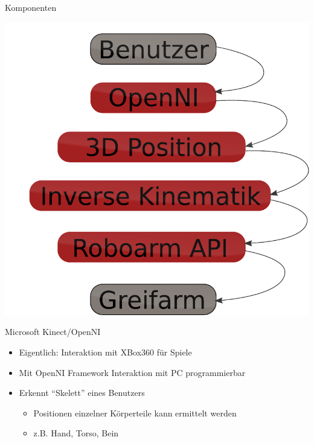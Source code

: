 \begin{frame}{Komponenten}
\begin{overprint}
 \begin{center}\includegraphics[height=0.8\textheight]{imgs/komponenten_5.pdf}\end{center}
\end{overprint}

\end{frame}

\begin{frame}{Microsoft Kinect/OpenNI}
	\begin{itemize}
	\item Eigentlich: Interaktion mit XBox360 für Spiele
	\item Mit OpenNI Framework Interaktion mit PC programmierbar
	\item Erkennt "`Skelett"' eines Benutzers
		\begin{itemize}
		\item Positionen einzelner Körperteile kann ermittelt werden
		\item z.B. Hand, Torso, Bein
		\end{itemize}
	\end{itemize}
\end{frame}

